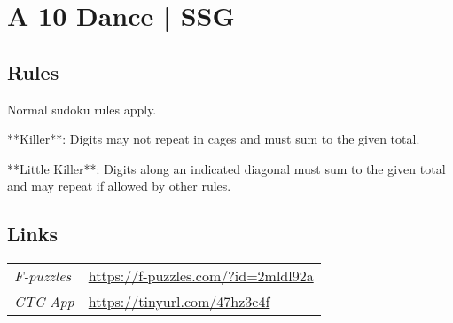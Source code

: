 \section[A 10 Dance | SSG {[\emph{Killer/Little Killer Sudoku}]}]{A 10 Dance | {\normalfont SSG}}
\label{sec:35-a-10-dance-ssg}

\subsection*{Rules}
\begin{markdown}
Normal sudoku rules apply.



**Killer**: Digits may not repeat in cages and must sum to the given total.



**Little Killer**: Digits along an indicated diagonal must sum to the given total and may repeat if allowed by other rules.
\end{markdown}
\subsection*{Links}
\begin{tabularx}{\textwidth}{l X}
\emph{F-puzzles} & \url{https://f-puzzles.com/?id=2mldl92a} \\
\emph{CTC App} & \url{https://tinyurl.com/47hz3c4f} \\
\end{tabularx}
\pagebreak
